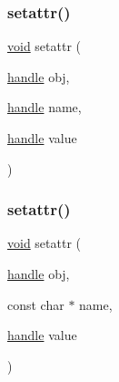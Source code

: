 \subsubsection{\texorpdfstring{setattr()}{setattr()}\hspace{0.1cm}{\footnotesize\ttfamily [1/2]}}
{\footnotesize\ttfamily \mbox{\hyperlink{_s_d_l__opengles2__gl2ext_8h_ae5d8fa23ad07c48bb609509eae494c95}{void}} setattr (\begin{DoxyParamCaption}\item[{\mbox{\hyperlink{classhandle}{handle}}}]{obj,  }\item[{\mbox{\hyperlink{classhandle}{handle}}}]{name,  }\item[{\mbox{\hyperlink{classhandle}{handle}}}]{value }\end{DoxyParamCaption})\hspace{0.3cm}{\ttfamily [inline]}}

\mbox{\label{group__python__builtins_ga173e320e2458d711bbcea25283cdd488}} 
\subsubsection{\texorpdfstring{setattr()}{setattr()}\hspace{0.1cm}{\footnotesize\ttfamily [2/2]}}
{\footnotesize\ttfamily \mbox{\hyperlink{_s_d_l__opengles2__gl2ext_8h_ae5d8fa23ad07c48bb609509eae494c95}{void}} setattr (\begin{DoxyParamCaption}\item[{\mbox{\hyperlink{classhandle}{handle}}}]{obj,  }\item[{const char $\ast$}]{name,  }\item[{\mbox{\hyperlink{classhandle}{handle}}}]{value }\end{DoxyParamCaption})\hspace{0.3cm}{\ttfamily [inline]}}

